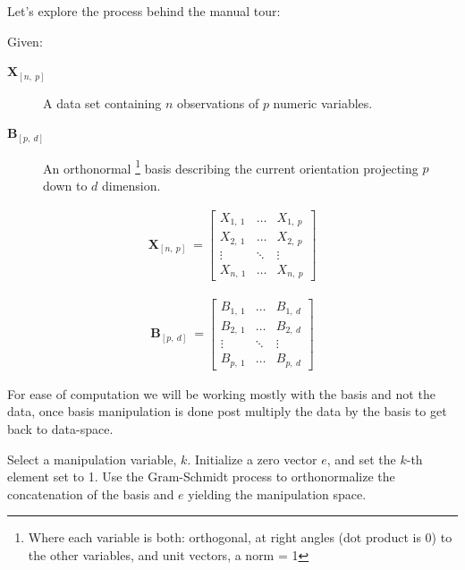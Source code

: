 \documentclass{monashthesis}
\begin{document}
Let's explore the process behind the manual tour:

Given:

\begin{description}
  \item[$\textbf{X}_{[n,~p]}$] A data set containing $n$ observations of $p$ numeric variables. 
  \item[$\textbf{B}_{[p,~d]}$] An orthonormal \footnote{Where each variable is both: orthogonal, at right angles (dot product is 0) to the other variables, and unit vectors, a norm = 1} basis describing the current orientation projecting $p$ down to $d$ dimension.
\end{description}

\begin{align*}
  \textbf{X}_{[n,~p]} ~=
  \begin{bmatrix}
    X_{1,~1} & \dots  & X_{1,~p} \\
    X_{2,~1} & \dots  & X_{2,~p} \\
    \vdots   & \ddots & \vdots   \\
    X_{n,~1} & \dots  & X_{n,~p}
  \end{bmatrix}
\end{align*}

\begin{align*}
  \textbf{B}_{[p,~d]} ~=
  \begin{bmatrix}
    B_{1,~1} & \dots  & B_{1,~d} \\
    B_{2,~1} & \dots  & B_{2,~d} \\
    \vdots   & \ddots & \vdots   \\
    B_{p,~1} & \dots  & B_{p,~d}
  \end{bmatrix}
\end{align*}

For ease of computation we will be working mostly with the basis and not
the data, once basis manipulation is done post multiply the data by the
basis to get back to data-space.

Select a manipulation variable, \(k\). Initialize a zero vector \(e\),
and set the \(k\)-th element set to 1. Use the Gram-Schmidt process to
orthonormalize the concatenation of the basis and \(e\) yielding the
manipulation space.
\end{document}
